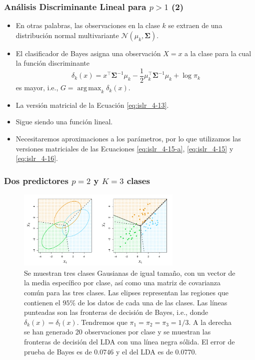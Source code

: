 \documentclass[usenames,dvipsnames]{beamer} %
\DeclareMathOperator*{\argmax}{arg\,max}
\begin{document}
\begin{frame}\frametitle{An\'alisis Discriminante Lineal para $p>1$ (2)}
\begin{itemize}
	\item En otras palabras, las observaciones en la clase $k$ se extraen de una distribuci\'on normal multivariante $\mathcal{N}(\mu_k,\bm \Sigma)$.
	\item El clasificador de Bayes asigna una observaci\'on $X=x$ a la clase para la cual la funci\'on discriminante
	\begin{equation}\label{eq:islr_4-19}
	\delta_k(x) = x^\top \bm \Sigma^{-1}\mu_k-  \frac{1}{2}\mu_k^{\top}\bm\Sigma^{-1}\mu_k+\log{\pi_k}
	\end{equation}
	es mayor, i.e., $G = \argmax_k \delta_k(x)$.
	\item La versi\'on matricial de la Ecuaci\'on \ref{eq:islr_4-13}.
	\item Sigue siendo una funci\'on lineal.
	\item Necesitaremos aproximaciones a los par\'ametros, por lo que utilizamos las versiones matriciales de las Ecuaciones \ref{eq:islr_4-15-a}, \ref{eq:islr_4-15} y \ref{eq:islr_4-16}.
\end{itemize}
\end{frame}

\begin{frame}\frametitle{Dos predictores $p=2$ y $K=3$ clases}
\begin{figure}
	\centering
	\includegraphics[width=0.7\textwidth]{images/islr/fig_4_6.png}
	\caption{Se muestran tres clases Gausianas de igual tama\~no, con un vector de la media espec\'ifico por clase, as\'i como una matriz de covarianza com\'un para las tres clases. Las elipses representan las regiones que contienen el $95\%$ de los datos de cada una de las clases. Las l\'ineas punteadas son las fronteras de decisi\'on de Bayes, i.e., donde $\delta_k(x)=\delta_l(x)$. Tendremos que $\pi_1=\pi_2=\pi_3=1/3$. A la derecha se han generado 20 observaciones por clase y se muestran las fronteras de decisi\'on del LDA con una l\'inea negra s\'olida. El error de prueba de Bayes es de $0.0746$ y el del LDA es de $0.0770$.}
	\label{fig:islr_4-6}
\end{figure}
\end{frame}
\end{document}
